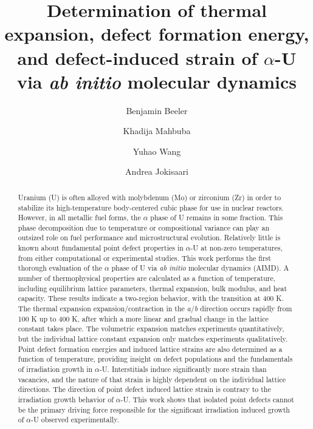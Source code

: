 \documentclass[review]{elsarticle}
\begin{document}
\begin{frontmatter}
\title{Determination of thermal expansion, defect formation energy, and defect-induced strain of $\alpha$-U via \textit{ab initio} molecular dynamics}

\author[ncsu,inl]{Benjamin Beeler}
\author[ncsu]{Khadija Mahbuba}
\author[mich]{Yuhao Wang}
\author[inl]{Andrea Jokisaari}
\address[ncsu]{North Carolina State University, Raleigh, NC 27607}
\address[inl]{Idaho National Laboratory, Idaho Falls, ID 83415}
\address[mich]{University of Michigan, Ann Arbor, MI 48109}

\begin{abstract}

Uranium (U) is often alloyed with molybdenum (Mo) or zirconium (Zr) in order to stabilize its high-temperature body-centered cubic phase for use in nuclear reactors. However, in all metallic fuel forms, the $\alpha$ phase of U remains in some fraction. This phase decomposition due to temperature or compositional variance can play an outsized role on fuel performance and microstructural evolution. Relatively little is known about fundamental point defect properties in $\alpha$-U at non-zero temperatures, from either computational or experimental studies. This work performs the first thorough evaluation of the $\alpha$ phase of U via \textit{ab initio} molecular dynamics (AIMD). A number of thermophysical properties are calculated as a function of temperature, including equilibrium lattice parameters, thermal expansion, bulk modulus, and heat capacity. These results indicate a two-region behavior, with the transition at 400 K. The thermal expansion expansion/contraction in the \textit{a}/\textit{b} direction occurs rapidly from 100 K up to 400 K, after which a more linear and gradual change in the lattice constant takes place. The volumetric expansion matches experiments quantitatively, but the individual lattice constant expansion only matches experiments qualitatively. Point defect formation energies and induced lattice strains are also determined as a function of temperature, providing insight on defect populations and the fundamentals of irradiation growth in $\alpha$-U. Interstitials induce significantly more strain than vacancies, and the nature of that strain is highly dependent on the individual lattice directions. The direction of point defect induced lattice strain is contrary to the irradiation growth behavior of $\alpha$-U. This work shows that isolated point defects cannot be the primary driving force responsible for the significant irradiation induced growth of $\alpha$-U observed experimentally. 

\end{abstract}
\end{frontmatter}
\end{document}
